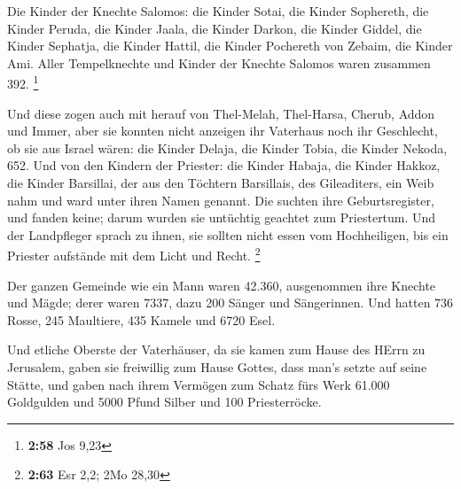  Die Kinder der Knechte Salomos: die Kinder Sotai, die
Kinder Sophereth, die Kinder Peruda,  die Kinder Jaala, die
Kinder Darkon, die Kinder Giddel,  die Kinder Sephatja, die
Kinder Hattil, die Kinder Pochereth von Zebaim, die Kinder Ami.
 Aller Tempelknechte und Kinder der Knechte Salomos waren
zusammen 392. \footnote{\textbf{2:58} Jos 9,23}

 Und diese zogen auch mit herauf von Thel-Melah,
Thel-Harsa, Cherub, Addon und Immer, aber sie konnten nicht anzeigen ihr
Vaterhaus noch ihr Geschlecht, ob sie aus Israel wären: 
die Kinder Delaja, die Kinder Tobia, die Kinder Nekoda, 652.
 Und von den Kindern der Priester: die Kinder Habaja, die
Kinder Hakkoz, die Kinder Barsillai, der aus den Töchtern Barsillais,
des Gileaditers, ein Weib nahm und ward unter ihren Namen genannt.
 Die suchten ihre Geburtsregister, und fanden keine; darum
wurden sie untüchtig geachtet zum Priestertum.  Und der
Landpfleger sprach zu ihnen, sie sollten nicht essen vom Hochheiligen,
bis ein Priester aufstände mit dem Licht und Recht. \footnote{\textbf{2:63}
  Esr 2,2; 2Mo 28,30}

 Der ganzen Gemeinde wie ein Mann waren 42.360,
 ausgenommen ihre Knechte und Mägde; derer waren 7337, dazu
200 Sänger und Sängerinnen.  Und hatten 736 Rosse, 245
Maultiere,  435 Kamele und 6720 Esel.

 Und etliche Oberste der Vaterhäuser, da sie kamen zum
Hause des HErrn zu Jerusalem, gaben sie freiwillig zum Hause Gottes,
dass man's setzte auf seine Stätte,  und gaben nach ihrem
Vermögen zum Schatz fürs Werk 61.000 Goldgulden und 5000 Pfund Silber
und 100 Priesterröcke.

